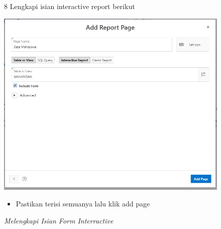 \begin{itemize}
        \begin{figure}[!htbp]
        \item[8]Lengkapi isian interactive report berikut 
        \begin{center}
        \includegraphics[scale=0.5]{figures/lengkapi_form_interractive.jpg}
        \caption{\textit{Melengkapi Isian Form Interractive}}
        \end{center}
        \begin{itemize}
            \item Pastikan terisi semuanya lalu klik add page  
        \end{itemize}
        \end{figure}
        

\end{itemize}

